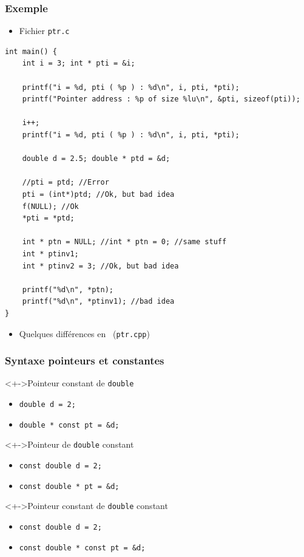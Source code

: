 \begin{frame}[containsverbatim]
\frametitle{Exemple}
\begin{itemize}
\item Fichier \texttt{ptr.c}
\end{itemize}
\begin{lstlisting}
int main() {
    int i = 3; int * pti = &i;

    printf("i = %d, pti ( %p ) : %d\n", i, pti, *pti);
    printf("Pointer address : %p of size %lu\n", &pti, sizeof(pti));

    i++;
    printf("i = %d, pti ( %p ) : %d\n", i, pti, *pti);

    double d = 2.5; double * ptd = &d;
	
    //pti = ptd; //Error
    pti = (int*)ptd; //Ok, but bad idea
    f(NULL); //Ok
    *pti = *ptd;

    int * ptn = NULL; //int * ptn = 0; //same stuff
    int * ptinv1;
    int * ptinv2 = 3; //Ok, but bad idea

    printf("%d\n", *ptn);
    printf("%d\n", *ptinv1); //bad idea
}
\end{lstlisting}
\begin{itemize}
\item Quelques différences en \cpp\ (\texttt{ptr.cpp})
\end{itemize}
\end{frame}

\begin{frame}
\frametitle{Syntaxe pointeurs et constantes}
\begin{exampleblock}<+->{Pointeur constant de \texttt{double}}
	\begin{itemize}[<+->]
	\item \lstinline|double d = 2;|
	\item \lstinline|double * const pt = &d;|
	\end{itemize}
\end{exampleblock}
\begin{exampleblock}<+->{Pointeur de \texttt{double} constant}
	\begin{itemize}[<+->]
	\item \lstinline|const double d = 2;|
	\item \lstinline|const double * pt = &d;|
	\end{itemize}
\end{exampleblock}
\begin{exampleblock}<+->{Pointeur constant de \texttt{double} constant}
	\begin{itemize}[<+->]
	\item \lstinline|const double d = 2;|
	\item \lstinline|const double * const pt = &d;|
	\end{itemize}
\end{exampleblock}
\end{frame}

